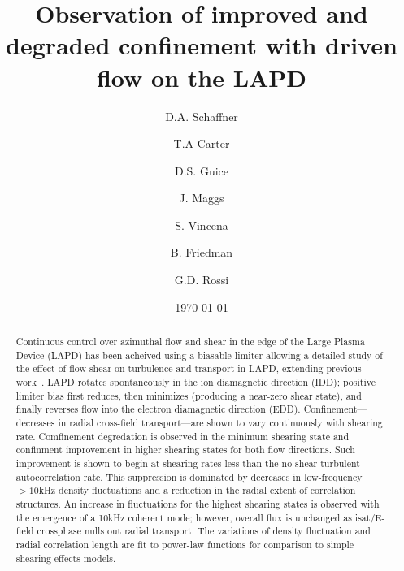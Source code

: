 \documentclass[%
 aps,
 prl,
 amsmath,amssymb,
 reprint,%
]{revtex4-1}
\begin{document}
\title{Observation of improved and degraded confinement with driven flow on the LAPD}
\author{D.A. Schaffner}
\author{T.A Carter}
\author{D.S. Guice}
\author{J. Maggs}
\author{S. Vincena}
\author{B. Friedman}
\author{G.D. Rossi}

\date{\today}%

\begin{abstract}
Continuous control over azimuthal flow and shear in the edge of the Large Plasma Device (LAPD) has been acheived using a biasable limiter allowing a detailed study of the effect of flow shear on turbulence and transport in LAPD, extending previous work~\cite{carter09}. LAPD rotates spontaneously in the ion diamagnetic direction (IDD); positive limiter bias first reduces, then minimizes (producing a near-zero shear state), and finally reverses flow into the electron diamagnetic direction (EDD). Confinement---decreases in radial cross-field transport---are shown to vary continuously with shearing rate. Comfinement degredation is observed in the minimum shearing state and confinment improvement in higher shearing states for both flow directions. Such improvement is shown to begin at shearing rates less than the no-shear turbulent autocorrelation rate. This suppression is dominated by decreases in low-frequency $>10$kHz density fluctuations and a reduction in the radial extent of correlation structures. An increase in fluctuations for the highest shearing states is observed with the emergence of a 10kHz coherent mode; however, overall flux is unchanged as isat/E-field crossphase nulls out radial transport. The variations of density fluctuation and radial correlation length are fit to power-law functions for comparison to simple shearing effects models.
\end{abstract}
\end{document}
